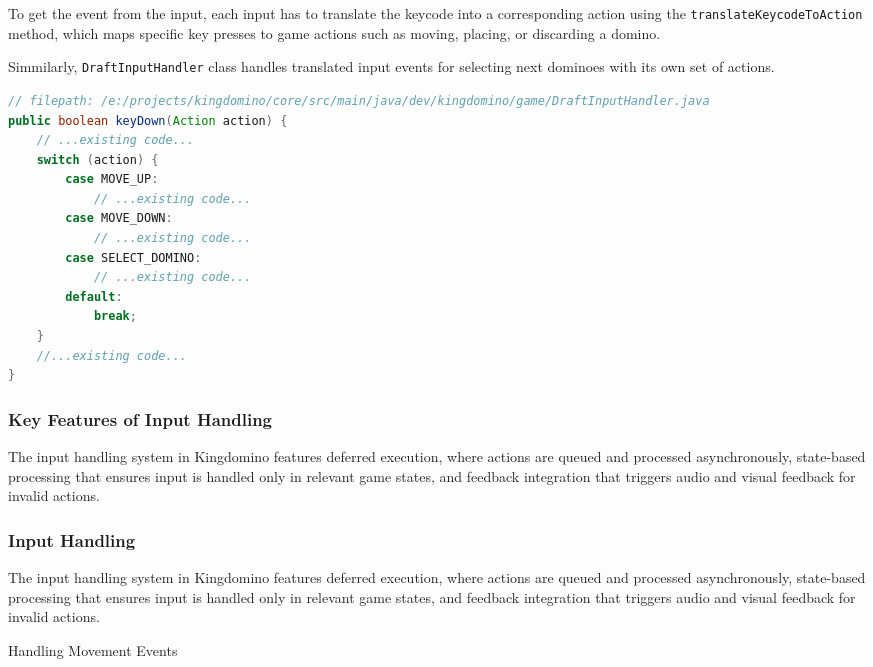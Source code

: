 \documentclass[conference]{IEEEtran}
\begin{document}
To get the event from the input, each input has to translate the keycode into a
corresponding action using the \texttt{translateKeycodeToAction} method, which
maps specific key presses to game actions such as moving, placing, or
discarding a domino.

Simmilarly, \texttt{DraftInputHandler} class handles translated input events
for selecting next dominoes with its own set of actions.

\begin{lstlisting}[language=Java]
// filepath: /e:/projects/kingdomino/core/src/main/java/dev/kingdomino/game/DraftInputHandler.java
public boolean keyDown(Action action) {
    // ...existing code...
    switch (action) {
        case MOVE_UP:
            // ...existing code...
        case MOVE_DOWN:
            // ...existing code...
        case SELECT_DOMINO:
            // ...existing code...
        default:
            break;
    }
    //...existing code...
}
\end{lstlisting}

\subsubsection{Key Features of Input Handling}
The input handling system in Kingdomino features deferred execution, where
actions are queued and processed asynchronously, state-based processing that
ensures input is handled only in relevant game states, and feedback integration
that triggers audio and visual feedback for invalid actions.


\subsubsection{Input Handling}
The input handling system in Kingdomino features deferred execution, where actions are queued and processed asynchronously, state-based processing that ensures input is handled only in relevant game states, and feedback integration that triggers audio and visual feedback for invalid actions.
\begin{algorithm}
    \caption{Handling Movement Events}
    \begin{algorithmic}
        \EndIf{}
    \end{algorithmic}
\end{algorithm}
\end{document}
